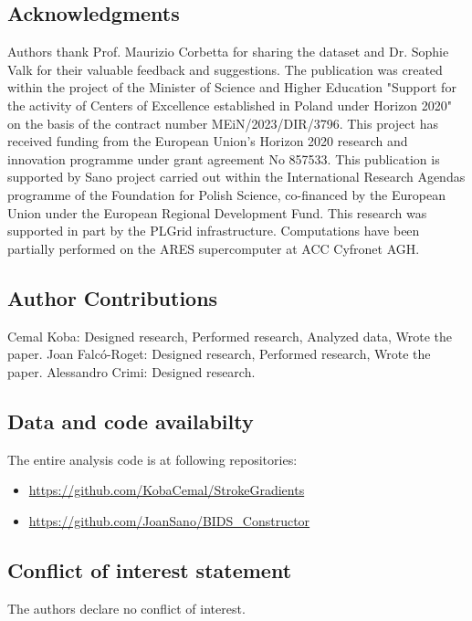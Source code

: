\documentclass[fleqn,10pt]{wlscirep}
\begin{document}
\subsection*{Acknowledgments}
Authors thank Prof. Maurizio Corbetta for sharing the dataset and Dr. Sophie Valk for their valuable feedback and suggestions.  The publication was created within the project of the Minister of Science and Higher Education "Support for the activity of Centers of Excellence established in Poland under Horizon 2020" on the basis of the contract number MEiN/2023/DIR/3796. This project has received funding from the European Union’s Horizon 2020 research and innovation programme under grant agreement No 857533. This publication is supported by Sano project carried out within the International Research Agendas programme of the Foundation for Polish Science, co-financed by the European Union under the European Regional Development Fund. This research was supported in part by the PLGrid infrastructure. Computations have been partially performed on the ARES supercomputer at ACC Cyfronet AGH. 
\subsection*{Author Contributions}
Cemal Koba: Designed research, Performed research, Analyzed data, Wrote the paper.
Joan Falc\'o-Roget: Designed research, Performed research, Wrote the paper.
Alessandro Crimi: Designed research.


\subsection*{Data and code availabilty}
The entire analysis code is at following repositories:
\begin{itemize}
    \item \href{https://github.com/KobaCemal/StrokeGradients}{https://github.com/KobaCemal/StrokeGradients}
    \item \href{https://github.com/JoanSano/BIDS_Constructor}{https://github.com/JoanSano/BIDS\_Constructor}
\end{itemize}  





\subsection*{Conflict of interest statement}
The authors declare no conflict of interest.
\end{document}
